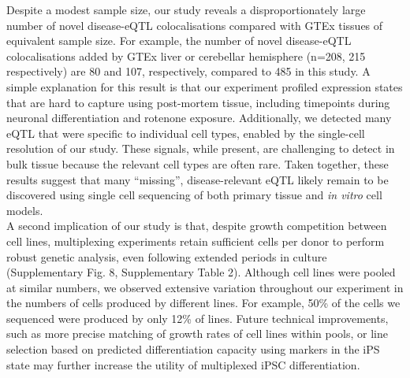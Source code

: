 Despite a modest sample size, our study reveals a disproportionately large number of novel disease-eQTL colocalisations compared with GTEx tissues of equivalent sample size. 
For example, the number of novel disease-eQTL colocalisations added by GTEx liver or cerebellar hemisphere (n=208, 215 respectively) are 80 and 107, respectively, compared to 485 in this study. 
A simple explanation for this result is that our experiment profiled expression states that are hard to capture using post-mortem tissue, including timepoints during neuronal differentiation and rotenone exposure. 
Additionally, we detected many eQTL that were specific to individual cell types, enabled by the single-cell resolution of our study.
These signals, while present, are challenging to detect in bulk tissue because the relevant cell types are often rare. 
Taken together, these results suggest that many “missing”, disease-relevant eQTL likely remain to be discovered using single cell sequencing of both primary tissue and \textit{in vitro} cell models.\\

A second implication of our study is that, despite growth competition between cell lines, multiplexing experiments retain sufficient cells per donor to perform robust genetic analysis, even following extended periods in culture (Supplementary Fig. 8, Supplementary Table 2). 
Although cell lines were pooled at similar numbers, we observed extensive variation throughout our experiment in the numbers of cells produced by different lines. 
For example, 50\% of the cells we sequenced were produced by only 12\% of lines.
Future technical improvements, such as more precise matching of growth rates of cell lines within pools, or line selection based on predicted differentiation capacity using markers in the iPS state may further increase the utility of multiplexed iPSC differentiation.

